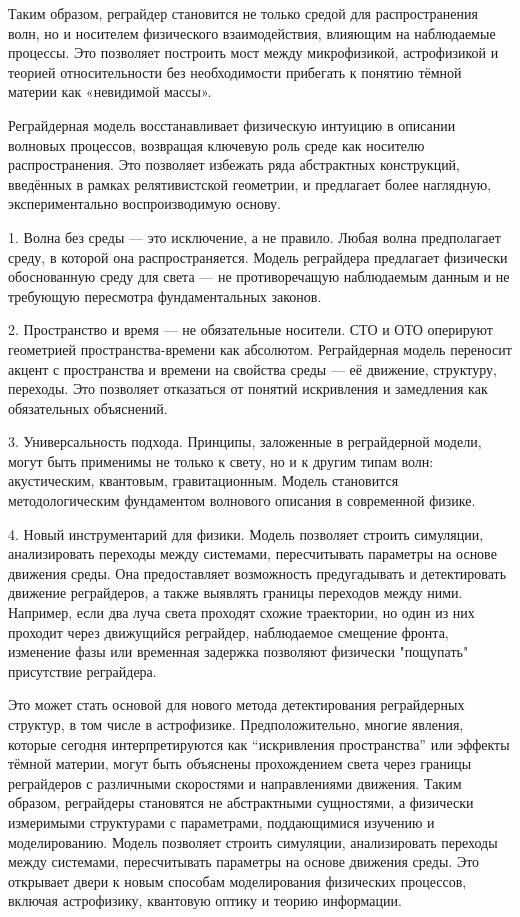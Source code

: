 \documentclass[12pt]{article}
\begin{document}
Таким образом, реграйдер становится не только средой для распространения волн, но и носителем физического взаимодействия, влияющим на наблюдаемые процессы. Это позволяет построить мост между микрофизикой, астрофизикой и теорией относительности без необходимости прибегать к понятию тёмной материи как «невидимой массы».

Реграйдерная модель восстанавливает физическую интуицию в описании волновых процессов, возвращая ключевую роль среде как носителю распространения. Это позволяет избежать ряда абстрактных конструкций, введённых в рамках релятивистской геометрии, и предлагает более наглядную, экспериментально воспроизводимую основу.

1. Волна без среды — это исключение, а не правило.
Любая волна предполагает среду, в которой она распространяется. Модель реграйдера предлагает физически обоснованную среду для света — не противоречащую наблюдаемым данным и не требующую пересмотра фундаментальных законов.

2. Пространство и время — не обязательные носители.
СТО и ОТО оперируют геометрией пространства-времени как абсолютом. Реграйдерная модель переносит акцент с пространства и времени на свойства среды — её движение, структуру, переходы. Это позволяет отказаться от понятий искривления и замедления как обязательных объяснений.

3. Универсальность подхода.
Принципы, заложенные в реграйдерной модели, могут быть применимы не только к свету, но и к другим типам волн: акустическим, квантовым, гравитационным. Модель становится методологическим фундаментом волнового описания в современной физике.

4. Новый инструментарий для физики.
Модель позволяет строить симуляции, анализировать переходы между системами, пересчитывать параметры на основе движения среды. Она предоставляет возможность предугадывать и детектировать движение реграйдеров, а также выявлять границы переходов между ними. Например, если два луча света проходят схожие траектории, но один из них проходит через движущийся реграйдер, наблюдаемое смещение фронта, изменение фазы или временная задержка позволяют физически "пощупать" присутствие реграйдера.

Это может стать основой для нового метода детектирования реграйдерных структур, в том числе в астрофизике. Предположительно, многие явления, которые сегодня интерпретируются как “искривления пространства” или эффекты тёмной материи, могут быть объяснены прохождением света через границы реграйдеров с различными скоростями и направлениями движения. Таким образом, реграйдеры становятся не абстрактными сущностями, а физически измеримыми структурами с параметрами, поддающимися изучению и моделированию.
Модель позволяет строить симуляции, анализировать переходы между системами, пересчитывать параметры на основе движения среды. Это открывает двери к новым способам моделирования физических процессов, включая астрофизику, квантовую оптику и теорию информации.
\end{document}
